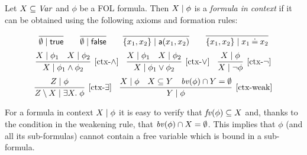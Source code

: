 \begin{definition}
	\label{def:formula in context}
	Let $X \subseteq \mathit{Var}$ and $\phi$ be a FOL formula. Then ${X} \mid {\phi}$ is a \emph{formula in context} if it can be obtained using the following axioms and formation rules:
	
	$$\infer{\ctx{\emptyset}{\True}}{} \qquad 
	\infer{\ctx{\emptyset}{\False}}{} \qquad 
	\infer{\ctx{\{x_1, x_2\}}{\la(x_1,x_2)}}{} \qquad 
	\infer{\ctx{\{x_1, x_2\}}{x_1\Eq x_2}}{}$$
	$$\infer[{[\mbox{ctx-}\wedge]}]{\ctx{X}{\phi_1 \wedge \phi_2}}{\ctx{X}{\phi_1} & \ctx{X}{\phi_2}} \quad 
	\infer[{[\mbox{ctx-}\vee]}]{\ctx{X}{\phi_1 \vee \phi_2}}{\ctx{X}{\phi_1} & \ctx{X}{\phi_2}} \quad 
	\infer[{[\mbox{ctx-}\neg]}]{\ctx{X}{\neg \phi}}{\ctx{X}{\phi}}$$
	$$\infer[{[\mbox{ctx-}\exists]}]{\ctx{Z \setminus X}{\exists X \st\phi}}{\ctx{Z}{\phi}} \quad 
\infer[{[\mbox{ctx-weak}]}]{\ctx{Y}{\phi}}{\ctx{X}{\phi} & X\subseteq Y & \bv(\phi)\cap Y = \emptyset}$$
\end{definition}
%
For a formula in context ${X} \mid {\phi}$ it is easy to verify that $\mathit{fv}(\phi) \subseteq X$ and, thanks to the condition in the weakening rule, that $\mathit{bv}(\phi) \cap X = \emptyset$. This implies that $\phi$ (and all its sub-formulas) cannot contain a free variable which is bound in a sub-formula. 

\medskip

